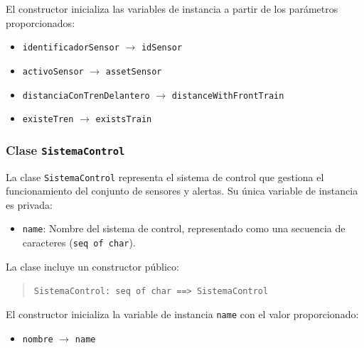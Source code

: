 \documentclass[journal]{IEEEtran}
\begin{document}
    El constructor inicializa las variables de instancia a partir de los parámetros proporcionados:
    \begin{itemize}
    \item \texttt{identificadorSensor} $\rightarrow$ \texttt{idSensor}
    \item \texttt{activoSensor} $\rightarrow$ \texttt{assetSensor}
    \item \texttt{distanciaConTrenDelantero} $\rightarrow$ \texttt{distanceWithFrontTrain}
    \item \texttt{existeTren} $\rightarrow$ \texttt{existsTrain}
    \end{itemize}




    \subsubsection*{Clase \texttt{SistemaControl}}

    La clase \texttt{SistemaControl} representa el sistema de control que gestiona el funcionamiento del conjunto de sensores y alertas. Su única variable de instancia es privada:

    \begin{itemize}
    \item \texttt{name}: Nombre del sistema de control, representado como una secuencia de caracteres (\texttt{seq of char}).
    \end{itemize}

    La clase incluye un constructor público:

    \begin{quote}
    \texttt{SistemaControl: seq of char \texttt{==>} SistemaControl}
    \end{quote}

    El constructor inicializa la variable de instancia \texttt{name} con el valor proporcionado:

    \begin{itemize}
    \item \texttt{nombre} $\rightarrow$ \texttt{name}
    \end{itemize}



\end{document}
